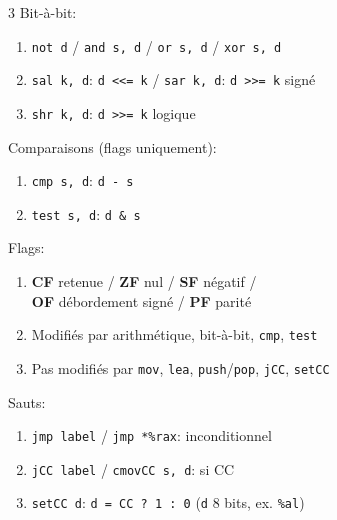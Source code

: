 \documentclass[12pt, a4paper]{article}
\begin{document}
\begin{multicols*}{3}
	Bit-à-bit:
	\begin{enumerate}[\roman*.]
		\item \lstinline|not d| / \lstinline|and s, d| / \lstinline|or s, d| / \lstinline|xor s, d|
		\item \lstinline|sal k, d|: \lstinline|d <<= k| / \lstinline|sar k, d|: \lstinline|d >>= k| signé
		\item \lstinline|shr k, d|: \lstinline|d >>= k| logique
	\end{enumerate}

	Comparaisons (flags uniquement):
	\begin{enumerate}[\roman*.]
		\item \lstinline|cmp s, d|: \lstinline|d - s|
		\item \lstinline|test s, d|: \lstinline|d & s|
	\end{enumerate}

	\colbreak

	Flags:
	\begin{enumerate}[\roman*.]
		\item \textbf{CF} retenue / \textbf{ZF} nul / \textbf{SF} négatif /\\ \textbf{OF} débordement signé / \textbf{PF} parité
		\item Modifiés par arithmétique, bit-à-bit, \lstinline|cmp|, \lstinline|test|
		\item Pas modifiés par \lstinline|mov|, \lstinline|lea|, \lstinline|push|/\lstinline|pop|, \lstinline|jCC|, \lstinline|setCC|
	\end{enumerate}

	Sauts:
	\begin{enumerate}[\roman*.]
		\item \lstinline|jmp label| / \lstinline|jmp *%rax|: inconditionnel
		\item \lstinline|jCC label| / \lstinline|cmovCC s, d|: si CC
		\item \lstinline|setCC d|: \lstinline|d = CC ? 1 : 0| (\lstinline|d| 8 bits, ex. \lstinline|%al|)
	\end{enumerate}


\end{multicols*}
\end{document}
